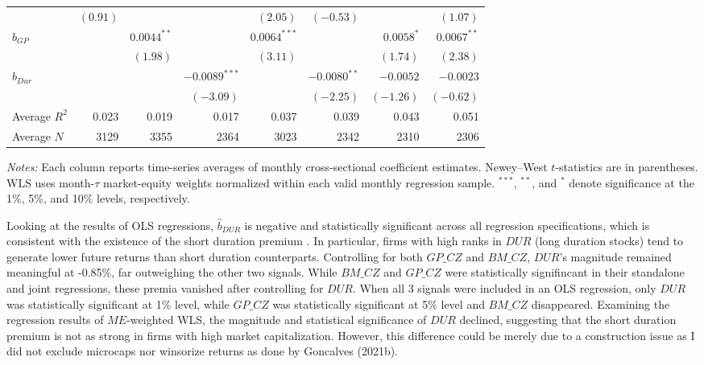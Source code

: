 \documentclass[11pt]{article}
\begin{document}
\begin{table}[H]
{\begin{tabular}{lrrrrrrr}
    & $(0.91)$ &  &  & $(2.05)$ & $(-0.53)$ &  & $(1.07)$ \\
    $b_{GP}$ &  & $0.0044^{**}$ &  & $0.0064^{***}$ &  & $0.0058^{*}$ & $0.0067^{**}$ \\
    &  & $(1.98)$ &  & $(3.11)$ &  & $(1.74)$ & $(2.38)$ \\
    $b_{Dur}$ &  &  & $-0.0089^{***}$ &  & $-0.0080^{**}$ & $-0.0052$ & $-0.0023$ \\
    &  &  & $(-3.09)$ &  & $(-2.25)$ & $(-1.26)$ & $(-0.62)$ \\
    Average $R^2$ & 0.023 & 0.019 & 0.017 & 0.037 & 0.039 & 0.043 & 0.051 \\
    Average $N$ & 3129 & 3355 & 2364 & 3023 & 2342 & 2310 & 2306 \\
    \bottomrule
  \end{tabular}%
  }
  \begin{minipage}{\textwidth}
  \footnotesize \textit{Notes:} Each column reports time-series averages of monthly cross-sectional coefficient estimates. Newey--West $t$-statistics are in parentheses. WLS uses month-$\tau$ market-equity weights normalized within each valid monthly regression sample. $^{***}$, $^{**}$, and $^{*}$ denote significance at the 1\%, 5\%, and 10\% levels, respectively.
  \end{minipage}
\end{table}

Looking at the results of OLS regressions, $\widehat{b}_{DUR}$ is negative and statistically significant across all regression specifications, which is consistent with the existence of the short duration premium \cite{goncalves2021short}. In particular, firms with high ranks in $DUR$ (long duration stocks) tend to generate lower future returns than short duration counterparts. Controlling for both $GP\_CZ$ and $BM\_CZ$, $DUR$'s magnitude remained meaningful at -0.85\%, far outweighing the other two signals. While $BM\_CZ$ and $GP\_CZ$ were statistically signifincant in their standalone and joint regressions, these premia vanished after controlling for $DUR$. When all 3 signals were included in an OLS regression, only $DUR$ was statistically significant at 1\% level, while $GP\_CZ$ was statistically significant at 5\% level and $BM\_CZ$ disappeared. Examining the regression results of $ME$-weighted WLS, the magnitude and statistical significance of $DUR$ declined, suggesting that the short duration premium is not as strong in firms with high market capitalization. However, this difference could be merely due to a construction issue as I did not exclude microcaps nor winsorize returns as done by Goncalves (2021b). 
\end{document}
